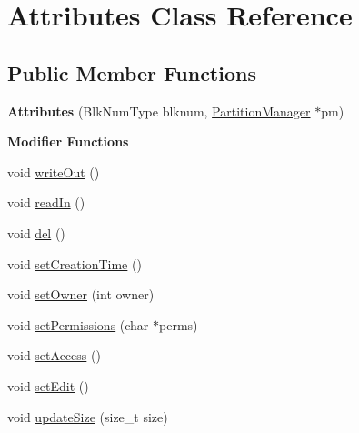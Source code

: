 \hypertarget{classAttributes}{}\section{Attributes Class Reference}
\label{classAttributes}
\subsection*{Public Member Functions}
\begin{DoxyCompactItemize}
\item 
\mbox{\label{classAttributes_a0d6b154029e34f811f0930806768f022}} 
{\bfseries Attributes} (Blk\+Num\+Type blknum, \mbox{\hyperlink{classPartitionManager}{Partition\+Manager}} $\ast$pm)
\end{DoxyCompactItemize}
\begin{Indent}\textbf{ Modifier Functions}\par
\begin{DoxyCompactItemize}
\item 
void \mbox{\hyperlink{classAttributes_a7eea700dd80e77a74afdc3c091a178b8}{write\+Out}} ()
\item 
void \mbox{\hyperlink{classAttributes_a6fc0012ff20912b8ee30167fefd1ab85}{read\+In}} ()
\item 
void \mbox{\hyperlink{classAttributes_acf28e724c914f066ecdae788d95b3212}{del}} ()
\item 
void \mbox{\hyperlink{classAttributes_a4caf96b812e181975045a172fe0dc438}{set\+Creation\+Time}} ()
\item 
void \mbox{\hyperlink{classAttributes_a56ab60c4bad40e1a47e096526f3ce57a}{set\+Owner}} (int owner)
\item 
void \mbox{\hyperlink{classAttributes_a15a4348203635ff53a6cd8c2d52c68e3}{set\+Permissions}} (char $\ast$perms)
\item 
void \mbox{\hyperlink{classAttributes_ae4861b7312f8619a6b2988b9456c4604}{set\+Access}} ()
\item 
void \mbox{\hyperlink{classAttributes_aa091d2dba315a124ea4a14308f2553c6}{set\+Edit}} ()
\item 
void \mbox{\hyperlink{classAttributes_a6ed2adf53cd6131c2b22a2782cd0bdcf}{update\+Size}} (size\+\_\+t size)
\end{DoxyCompactItemize}
\end{Indent}

